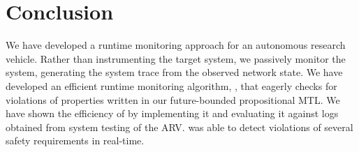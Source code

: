 
\section{Conclusion}
We have developed a runtime monitoring approach for an autonomous research vehicle. 
Rather than instrumenting the target system, we passively monitor the system, generating the system trace from the observed network state.
We have developed an efficient runtime monitoring algorithm, \monitor, that eagerly checks for violations of properties written in our future-bounded propositional MTL. 
We have shown the efficiency of \monitor by implementing it and evaluating it against logs obtained from system testing of the ARV. 
\monitor was able to detect violations of several safety requirements in real-time.
